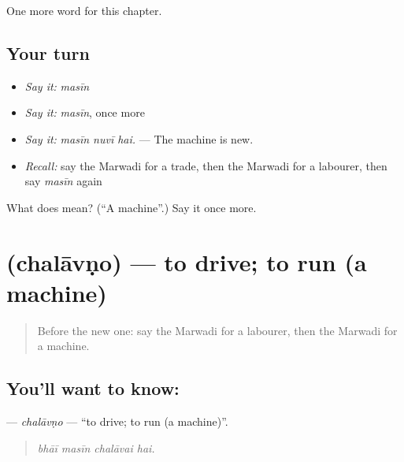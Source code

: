 \begin{grammarlens}[title={What you've built}]
One more word for this chapter.
\end{grammarlens}

\subsection*{Your turn}
\begin{itemize}
\raggedright
  \item \emph{Say it:} \emph{masīn}
  \item \emph{Say it:} \emph{masīn}, once more
  \item \emph{Say it:} \emph{masīn nuvī hai.} — The machine is new.
  \item \emph{Recall:} say the Marwadi for a trade, then the Marwadi for a labourer, then say \emph{masīn} again
\end{itemize}

\begin{tcolorbox}[breakable,colback=teal!4,colframe=teal!35!black,title={Before you move on}]
What does  mean? (\textquotedblleft{}A machine\textquotedblright{}.) Say it once more.
\end{tcolorbox}
\section[\texorpdfstring{\mw{चलावणो} (chalāvṇo)}{चलावणो (chalāvṇo)}]{ (chalāvṇo) — to drive; to run (a machine)}

\label{lesson:MW-C289-chalavno}



\begin{quote}
Before the new one: say the Marwadi for a labourer, then the Marwadi for a machine.
\end{quote}

\subsection*{You'll want to know: }
\textbf{} — \emph{chalāvṇo} — \textquotedblleft{}to drive; to run (a machine)\textquotedblright{}.

\begin{quote}
   
\end{quote}

\begin{quote}
\emph{bhāī masīn chalāvai hai.}
\end{quote}

